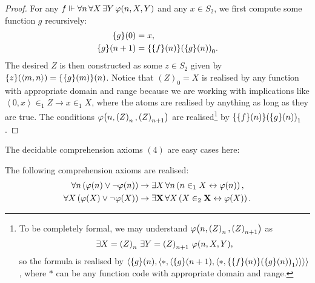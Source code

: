 \documentclass[11pt]{article}
\theoremstyle{plain}
\theoremstyle{definition}
\newcommand{\tuple}[1]{\left\langle #1 \right\rangle}
\begin{document}
\begin{proof}
    For any $f \Vdash \forall n \, \forall X \, \exists Y \, \varphi\mleft(n, X, Y\mright)$ and any $x \in S_2$, we first compute some function $g$ recursively:
    \begin{align*}
        \mleft\{g\mright\}\mleft(0\mright)     & = x,                                                                                                      \\
        \mleft\{g\mright\}\mleft(n + 1\mright) & = \mleft\{\mleft\{f\mright\}\mleft(n\mright)\mright\}\mleft(\mleft\{g\mright\}\mleft(n\mright)\mright)_0.
    \end{align*}
    The desired $Z$ is then constructed as some $z \in S_2$ given by $\mleft\{z\mright\}\mleft(\tuple{m, n}\mright) = \mleft\{\mleft\{g\mright\}\mleft(m\mright)\mright\}\mleft(n\mright)$. Notice that $\left(Z\right)_0 = X$ is realised by any function with appropriate domain and range because we are working with implications like $\tuple{0, x} \in_1 Z \rightarrow x \in_1 X$, where the atoms are realised by anything as long as they are true. The conditions $\varphi\mleft(n, \left(Z\right)_n, \left(Z\right)_{n + 1}\mright)$ are realised\footnote{To be completely formal, we may understand $\varphi\mleft(n, \left(Z\right)_n, \left(Z\right)_{n + 1}\mright)$ as
        \[\exists X = \left(Z\right)_n \, \exists Y = \left(Z\right)_{n + 1} \, \varphi\mleft(n, X, Y\mright),\]
        so the formula is realised by $\tuple{\mleft\{g\mright\}\mleft(n\mright), \tuple{*, \tuple{\mleft\{g\mright\}\mleft(n + 1\mright), \tuple{*, \mleft\{\mleft\{f\mright\}\mleft(n\mright)\mright\}\mleft(\mleft\{g\mright\}\mleft(n\mright)\mright)_1}}}}$, where $*$ can be any function code with appropriate domain and range.} by $\mleft\{\mleft\{f\mright\}\mleft(n\mright)\mright\}\mleft(\mleft\{g\mright\}\mleft(n\mright)\mright)_1$.
\end{proof}

The decidable comprehension axioms $\left(4\right)$ are easy cases here:

\begin{proposition}
    The following comprehension axioms are realised:
    \begin{align*}
        \forall n \left(\varphi\mleft(n\mright) \lor \neg \varphi\mleft(n\mright)\right) & \rightarrow \exists X \, \forall n \left(n \in_1 X \leftrightarrow \varphi\mleft(n\mright)\right),                   \\
        \forall X \left(\varphi\mleft(X\mright) \lor \neg \varphi\mleft(X\mright)\right) & \rightarrow \exists \mathbf{X} \, \forall X \left(X \in_2 \mathbf{X} \leftrightarrow \varphi\mleft(X\mright)\right).
    \end{align*}
\end{proposition}
\end{document}
